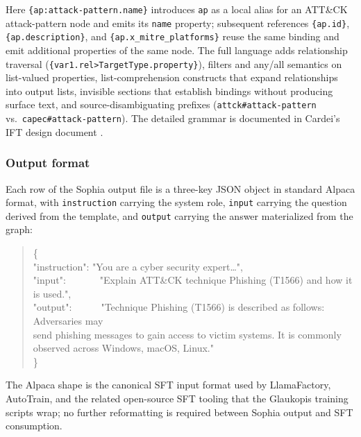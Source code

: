 \documentclass[unnumsec,webpdf,contemporary,large]{oup-authoring-template}
\theoremstyle{thmstyleone}
\theoremstyle{thmstyletwo}
\theoremstyle{thmstylethree}
\begin{document}
Here \verb|{ap:attack-pattern.name}| introduces \texttt{ap} as a local alias for an ATT\&CK attack-pattern node and emits its \texttt{name} property; subsequent references \verb|{ap.id}|, \verb|{ap.description}|, and \verb|{ap.x_mitre_platforms}| reuse the same binding and emit additional properties of the same node. The full language adds relationship traversal (\verb|{var1.rel>TargetType.property}|), filters and any/all semantics on list-valued properties, list-comprehension constructs that expand relationships into output lists, invisible sections that establish bindings without producing surface text, and source-disambiguating prefixes (\verb|attck#attack-pattern| vs.\ \verb|capec#attack-pattern|). The detailed grammar is documented in Cardei's IFT design document \cite{cardei2025ift}.

\subsubsection*{Output format}
Each row of the Sophia output file is a three-key JSON object in standard Alpaca format, with \texttt{instruction} carrying the system role, \texttt{input} carrying the question derived from the template, and \texttt{output} carrying the answer materialized from the graph:

\begin{quote}\small\ttfamily
\{\\
\hspace*{1em}"instruction": "You are a cyber security expert\ldots",\\
\hspace*{1em}"input":\ \ \ \ \ \ \ "Explain ATT\&CK technique Phishing (T1566) and how it is used.",\\
\hspace*{1em}"output":\ \ \ \ \ \ "Technique Phishing (T1566) is described as follows: Adversaries may\\
\hspace*{1em}\hspace*{1em}\hspace*{1em} send phishing messages to gain access to victim systems. It is commonly\\
\hspace*{1em}\hspace*{1em}\hspace*{1em} observed across Windows, macOS, Linux."\\
\}
\end{quote}

The Alpaca shape is the canonical SFT input format used by LlamaFactory, AutoTrain, and the related open-source SFT tooling that the Glaukopis training scripts wrap; no further reformatting is required between Sophia output and SFT consumption.
\end{document}
